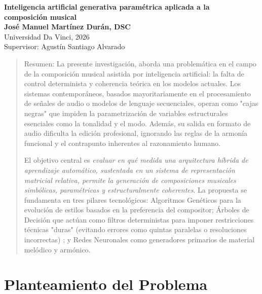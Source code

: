 \documentclass[12pt]{report}
\begin{document}
\thispagestyle{empty}
\mbox{}
\newpage

\newpage
\begin{center}
\doublespacing
\textbf{Inteligencia artificial generativa paramétrica aplicada a la \\ composición musical} \\
\vspace{1em}
\textbf{José Manuel Martínez Durán, DSC} \\
Universidad Da Vinci, 2026 \\
Supervisor: Agustín Santiago Alvarado
\end{center}
\vspace{1em}
\begin{quote}
\doublespacing
Resumen: La presente investigación, aborda una problemática en el campo de la composición musical asistida por inteligencia artificial: la falta de control determinista y coherencia teórica en los modelos actuales. Los sistemas contemporáneos, basados mayoritariamente en el procesamiento de señales de audio o modelos de lenguaje secuenciales, operan como "cajas negras" que impiden la parametrización de variables estructurales esenciales como la tonalidad y el modo. Además, su salida en formato de audio dificulta la edición profesional, ignorando las reglas de la armonía funcional y el contrapunto inherentes al razonamiento humano.

El objetivo central es \textit{evaluar en qué medida una arquitectura híbrida de aprendizaje automático, sustentada en un sistema de representación matricial relativa, permite la generación de composiciones musicales simbólicas, paramétricas y estructuralmente coherentes}. La propuesta se fundamenta en tres pilares tecnológicos: Algoritmos Genéticos para la evolución de estilos basados en la preferencia del compositor; Árboles de Decisión que actúan como filtros deterministas para imponer restricciones técnicas "duras" (evitando errores como quintas paralelas o resoluciones incorrectas) ; y Redes Neuronales como generadores primarios de material melódico y armónico.
\end{quote}
\vspace*{\fill}
\newpage

\tableofcontents \newpage
\listoftables \newpage
\listoffigures \newpage

\doublespacing

\chapter{Planteamiento del Problema}
\end{document}
